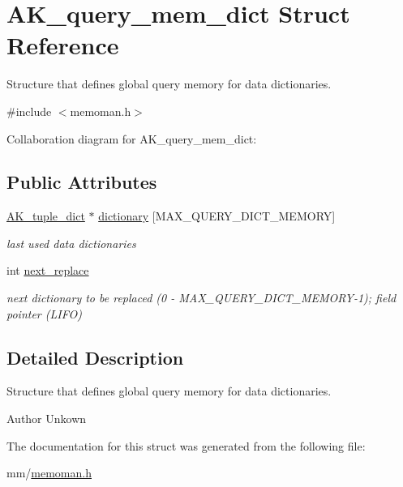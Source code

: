 \hypertarget{structAK__query__mem__dict}{\section{A\+K\+\_\+query\+\_\+mem\+\_\+dict Struct Reference}
\label{structAK__query__mem__dict}
}


Structure that defines global query memory for data dictionaries.  




{\ttfamily \#include $<$memoman.\+h$>$}



Collaboration diagram for A\+K\+\_\+query\+\_\+mem\+\_\+dict\+:
\subsection*{Public Attributes}
\begin{DoxyCompactItemize}
\item 
\hypertarget{structAK__query__mem__dict_a7345f65af9aecdbb66a14d6e81a8b012}{\hyperlink{structAK__tuple__dict}{A\+K\+\_\+tuple\+\_\+dict} $\ast$ \hyperlink{structAK__query__mem__dict_a7345f65af9aecdbb66a14d6e81a8b012}{dictionary} \mbox{[}M\+A\+X\+\_\+\+Q\+U\+E\+R\+Y\+\_\+\+D\+I\+C\+T\+\_\+\+M\+E\+M\+O\+R\+Y\mbox{]}}\label{structAK__query__mem__dict_a7345f65af9aecdbb66a14d6e81a8b012}

\begin{DoxyCompactList}\small\item\em last used data dictionaries \end{DoxyCompactList}\item 
\hypertarget{structAK__query__mem__dict_a9029c5332af6a016de520e13889a846f}{int \hyperlink{structAK__query__mem__dict_a9029c5332af6a016de520e13889a846f}{next\+\_\+replace}}\label{structAK__query__mem__dict_a9029c5332af6a016de520e13889a846f}

\begin{DoxyCompactList}\small\item\em next dictionary to be replaced (0 -\/ M\+A\+X\+\_\+\+Q\+U\+E\+R\+Y\+\_\+\+D\+I\+C\+T\+\_\+\+M\+E\+M\+O\+R\+Y-\/1); field pointer (L\+I\+F\+O) \end{DoxyCompactList}\end{DoxyCompactItemize}


\subsection{Detailed Description}
Structure that defines global query memory for data dictionaries. 

\begin{DoxyAuthor}{Author}
Unkown 
\end{DoxyAuthor}


The documentation for this struct was generated from the following file\+:\begin{DoxyCompactItemize}
\item 
mm/\hyperlink{memoman_8h}{memoman.\+h}\end{DoxyCompactItemize}
